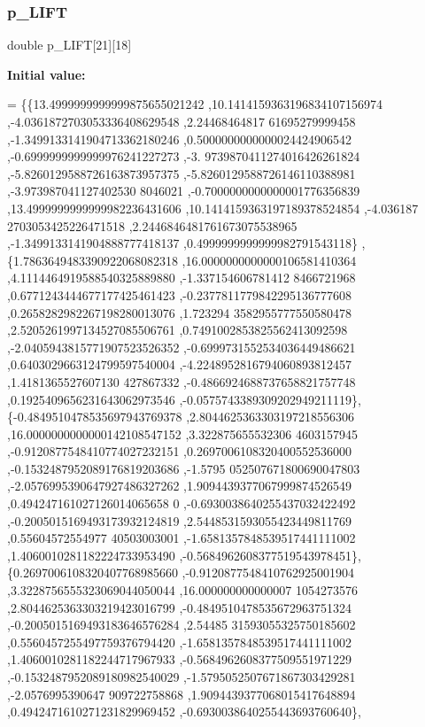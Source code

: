 \subsubsection{\texorpdfstring{p\+\_\+\+L\+I\+FT}{p\_LIFT}}
{\footnotesize\ttfamily double p\+\_\+\+L\+I\+FT\mbox{[}21\mbox{]}\mbox{[}18\mbox{]}}

{\bfseries Initial value\+:}
\begin{DoxyCode}
= \{\{13.4999999999999875655021242 ,10.1414159363196834107156974 ,-4.0361872703053336408629548 ,2.24468464817
      61695279999458 ,-1.3499133141904713362180246 ,0.5000000000000024424906542 ,-0.6999999999999976241227273 ,-3.
      9739870411274016426261824 ,-5.8260129588726163873957375 ,-5.8260129588726146110388981 ,-3.973987041127402530
      8046021 ,-0.7000000000000001776356839 ,13.4999999999999982236431606 ,10.1414159363197189378524854 ,-4.036187
      2703053425226471518 ,2.2446846481761673075538965 ,-1.3499133141904888777418137 ,0.4999999999999982791543118\}
      ,
\{1.7863649483390922068082318 ,16.0000000000000106581410364 ,4.1114464919588540325889880 ,-1.337154606781412
      8466721968 ,0.6771243444677177425461423 ,-0.2377811779842295136777608 ,0.2658282982267198280013076 ,1.723294
      3582955777550580478 ,2.5205261997134527085506761 ,0.7491002853825562413092598 ,-2.0405943815771907523526352 
      ,-0.6999731552534036449486621 ,0.6403029663124799597540004 ,-4.2248952816794060893812457 ,1.4181365527607130
      427867332 ,-0.4866924688737658821757748 ,0.1925409656231643062973546 ,-0.0575743389309202949211119\},
\{-0.4849510478535697943769378 ,2.8044625363303197218556306 ,16.0000000000000142108547152 ,3.322875655532306
      4603157945 ,-0.9120877548410774027232151 ,0.2697006108320400552536000 ,-0.1532487952089176819203686 ,-1.5795
      052507671800690047803 ,-2.0576995390647927486327262 ,1.9094439377067999874526549 ,0.494247161027126014065658
      0 ,-0.6930038640255437032422492 ,-0.2005015169493173932124819 ,2.5448531593055423449811769 ,0.55604572554977
      40503003001 ,-1.6581357848539517441111002 ,1.4060010281182224733953490 ,-0.5684962608377519543978451\},
\{0.2697006108320407768985660 ,-0.9120877548410762925001904 ,3.3228756555323069044050044 ,16.000000000000007
      1054273576 ,2.8044625363303219423016799 ,-0.4849510478535672963751324 ,-0.2005015169493183646576284 ,2.54485
      31593055325750185602 ,0.5560457255497759376794420 ,-1.6581357848539517441111002 ,1.4060010281182244717967933
       ,-0.5684962608377509551971229 ,-0.1532487952089180982540029 ,-1.5795052507671867303429281 ,-2.0576995390647
      909722758868 ,1.9094439377068015417648894 ,0.4942471610271231829969452 ,-0.6930038640255443693760640\},

\end{DoxyCode}
